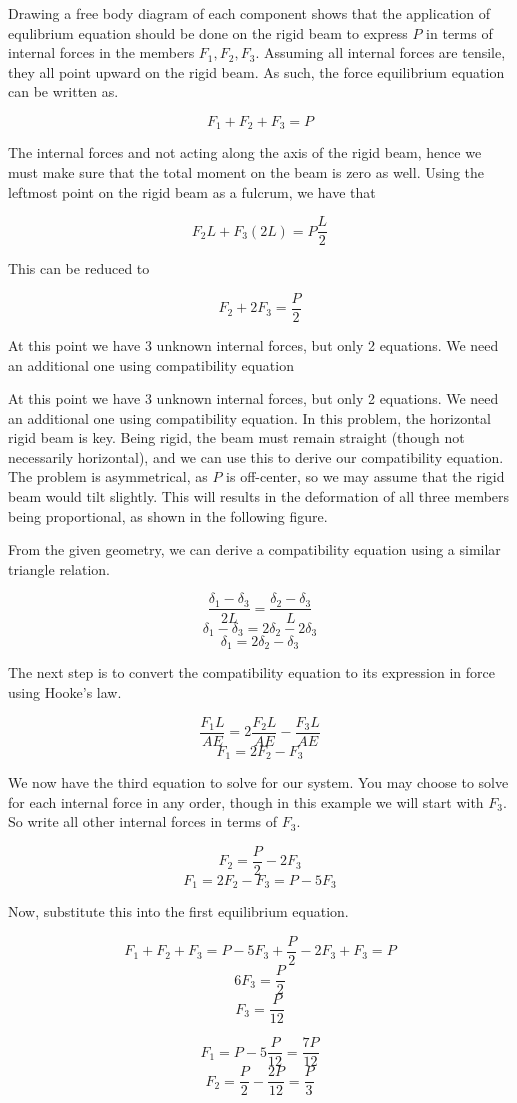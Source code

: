 \documentclass[
10pt,
a4paper,
openany,
svgnames,
]{book} %
\begin{document}
\begin{solution}

  Drawing a free body diagram of each component shows that the application of equlibrium equation should be done on the rigid beam to express $P$ in terms of internal forces in the members $F_1, F_2, F_3$. Assuming all internal forces are tensile, they all point upward on the rigid beam. As such, the force equilibrium equation can be written as.

 \[ F_1 + F_2 + F_3 = P \]

 The internal forces and not acting along the axis of the rigid beam, hence we must make sure that the total moment on the beam is zero as well. Using the leftmost point on the rigid beam as a fulcrum, we have that

 $$ F_2 L + F_3 (2L) = P \frac{L}{2} $$

 This can be reduced to 

 $$ F_2 + 2F_3 = \frac{P}{2} $$

 At this point we have 3 unknown internal forces, but only 2 equations. We need an additional one using compatibility equation

 At this point we have 3 unknown internal forces, but only 2 equations. We need an additional one using compatibility equation. In this problem, the horizontal rigid beam is key. Being rigid, the beam must remain straight (though not necessarily horizontal), and we can use this to derive our compatibility equation. The problem is asymmetrical, as $P$ is off-center, so we may assume that the rigid beam would tilt slightly. This will results in the deformation of all three members being proportional, as shown in the following figure.


 From the given geometry, we can derive a compatibility equation using a similar triangle relation.

 $$ \frac{\delta_1 - \delta_3}{2L} = \frac{\delta_2 - \delta_3}{L} $$
 $$ \delta_1 - \delta_3 = 2\delta_2 - 2\delta_3 $$
 $$ \delta_1 = 2\delta_2 - \delta_3 $$

 The next step is to convert the compatibility equation to its expression in force using Hooke's law.

 $$ \frac{F_1 L}{AE} = 2\frac{F_2 L}{AE} - \frac{F_3 L}{AE} $$
 $$ F_1 = 2F_2 - F_3 $$

 We now have the third equation to solve for our system. You may choose to solve for each internal force in any order, though in this example we will start with $F_3$. So write all other internal forces in terms of $F_3$.

 $$ F_2 = \frac{P}{2} - 2F_3 $$
 $$ F_1 = 2F_2 - F_3 = P - 5F_3 $$

 Now, substitute this into the first equilibrium equation.

 $$ F_1 + F_2 + F_3 = P - 5F_3 + \frac{P}{2} - 2F_3 + F_3 = P $$
 $$ 6F_3 = \frac{P}{2} $$
 $$ F_3 = \frac{P}{12} $$

 $$ F_1 = P - 5 \frac{P}{12} = \frac{7P}{12} $$
 $$ F_2 = \frac{P}{2} - \frac{2P}{12} = \frac{P}{3} $$
\end{solution}
\end{document}
